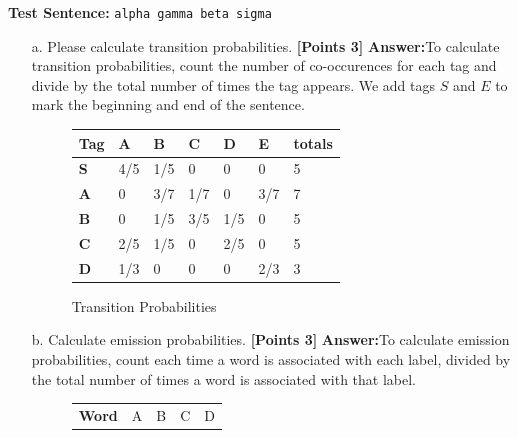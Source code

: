 \documentclass[12pt]{article}
\newcommand\tab[1][1cm]{\hspace*{#1}}
\newcommand\n{\newline}
\begin{document}
\begin{enumerate}
          \textbf{Test Sentence:} \verb/alpha gamma beta sigma/

          \begin{enumerate}
              \item[a.] Please calculate transition probabilities.
                  \textbf{[Points 3]}
                  \n\textbf{Answer:}\n\tab To calculate transition
                  probabilities, count the number of co-occurences for each tag
                  and divide by the total number of times the tag appears. We add
                  tags $S$ and $E$ to mark the beginning and end of the
                  sentence.
                  \begin{figure}[h]
                      \centering
                      \begin{tabular}{|l|l|l|l|l|l|l|}
                          \hline
                          \textbf{Tag} & A   & B   & C   & D   & E   & totals \\
                          \hline
                          \textbf{S}   & 4/5 & 1/5 & 0   & 0   & 0   & 5      \\
                          \textbf{A}   & 0   & 3/7 & 1/7 & 0   & 3/7 & 7      \\
                          \textbf{B}   & 0   & 1/5 & 3/5 & 1/5 & 0   & 5      \\
                          \textbf{C}   & 2/5 & 1/5 & 0   & 2/5 & 0   & 5      \\
                          \textbf{D}   & 1/3 & 0   & 0   & 0   & 2/3 & 3      \\
                          \hline
                      \end{tabular}
                      \caption{Transition Probabilities}
                  \end{figure}
                  \newpage
              \item[b.] Calculate emission probabilities. \textbf{[Points 3]}
                  \n\textbf{Answer:}\n\tab To calculate emission probabilities,
                  count each time a word is associated with each label, divided
                  by the total number of times a word is associated with that
                  label.
                  \begin{figure}[h]
                      \centering
                      \begin{tabular}{|l|l|l|l|l|}
                          \hline
                          \textbf{Word}       & A   & B   & C   & D   \\

\end{tabular}
\end{figure}
\end{enumerate}
\end{enumerate}
\end{document}
